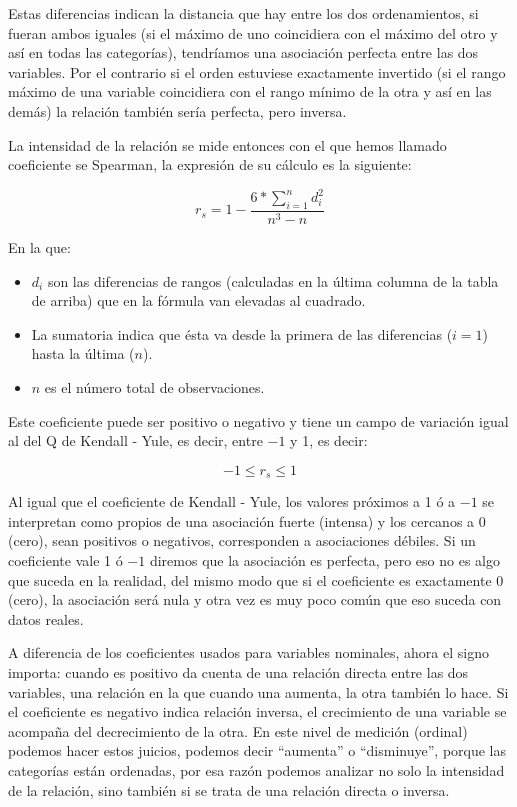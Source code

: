 \documentclass[]{book}
\begin{document}
Estas diferencias indican la distancia que hay entre los dos
ordenamientos, si fueran ambos iguales (si el máximo de uno coincidiera
con el máximo del otro y así en todas las categorías), tendríamos una
asociación perfecta entre las dos variables. Por el contrario si el
orden estuviese exactamente invertido (si el rango máximo de una
variable coincidiera con el rango mínimo de la otra y así en las demás)
la relación también sería perfecta, pero inversa.

La intensidad de la relación se mide entonces con el que hemos llamado
coeficiente se Spearman, la expresión de su cálculo es la siguiente:

\[r_{s} = 1 - \frac{6*\sum_{i = 1}^{n}d_{i}^{2}}{n^{3} - n}\]

En la que:

\begin{itemize}
\item
  \(d_{i}\) son las diferencias de rangos (calculadas en la última columna de la tabla de arriba) que en la fórmula van elevadas al cuadrado.
\item
  La sumatoria indica que ésta va desde la primera de las diferencias (\(i=1\)) hasta la última (\(n\)).
\item
  \(n\) es el número total de observaciones.
\end{itemize}

Este coeficiente puede ser positivo o negativo y tiene un campo de
variación igual al del Q de Kendall - Yule, es decir, entre \(-1\) y 1, es decir:

\[- 1 \leq r_{s} \leq 1\]

Al igual que el coeficiente de Kendall - Yule, los valores próximos a 1 ó a \(-1\) se interpretan como propios de una asociación fuerte (intensa) y
los cercanos a 0 (cero), sean positivos o negativos, corresponden a
asociaciones débiles. Si un coeficiente vale 1 ó \(-1\) diremos que la
asociación es perfecta, pero eso no es algo que suceda en la realidad,
del mismo modo que si el coeficiente es exactamente 0 (cero), la
asociación será nula y otra vez es muy poco común que eso suceda con
datos reales.

A diferencia de los coeficientes usados para variables nominales, ahora
el signo importa: cuando es positivo da cuenta de una relación directa
entre las dos variables, una relación en la que cuando una aumenta, la
otra también lo hace. Si el coeficiente es negativo indica relación
inversa, el crecimiento de una variable se acompaña del decrecimiento de
la otra. En este nivel de medición (ordinal) podemos hacer estos
juicios, podemos decir ``aumenta'' o ``disminuye'', porque las categorías
están ordenadas, por esa razón podemos analizar no solo la intensidad de
la relación, sino también si se trata de una relación directa o inversa.
\end{document}
